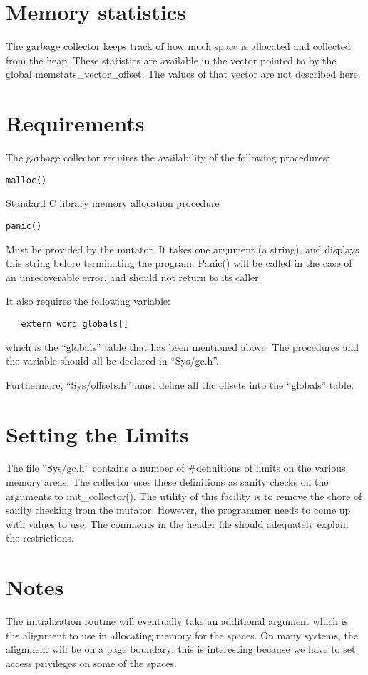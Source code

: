 \section{Memory statistics}

The garbage collector keeps track of how much space is allocated and
collected from the heap. These statistics are available in the vector 
pointed to by the global {\sc memstats\_vector\_offset}. The values of
that vector are not described here.

\section{Requirements}

The garbage collector requires the availability of the following 
procedures:
\begin{description}
\item {\tt malloc()}

Standard C library memory allocation procedure

\item {\tt panic()}

Must be provided by the mutator. It takes one argument (a string), and
displays this string before terminating the program. Panic() will be
called in the case of an unrecoverable error, and should not return to
its caller.
\end{description}
It also requires the following variable:
\begin{verbatim}
   extern word globals[]
\end{verbatim}
which is the ``globals'' table that has been mentioned above.
The procedures and the variable should all be declared in ``Sys/gc.h''.

Furthermore, ``Sys/offsets.h'' must define all the offsets into the 
``globals'' table.


\section{Setting the Limits}

The file ``Sys/gc.h'' contains a number of \#definitions of limits on the
various memory areas. The collector uses these definitions as sanity checks
on the arguments to init\_collector(). The utility of this facility is to
remove the chore of sanity checking from the mutator.  However, the
programmer needs to come up with values to use. The comments in the header
file should adequately explain the restrictions.


\section{Notes}

The initialization routine will eventually take an additional argument
which is the alignment to use in allocating memory for the spaces. On many
systems, the alignment will be on a page boundary; this is interesting
because we have to set access privileges on some of the spaces.

